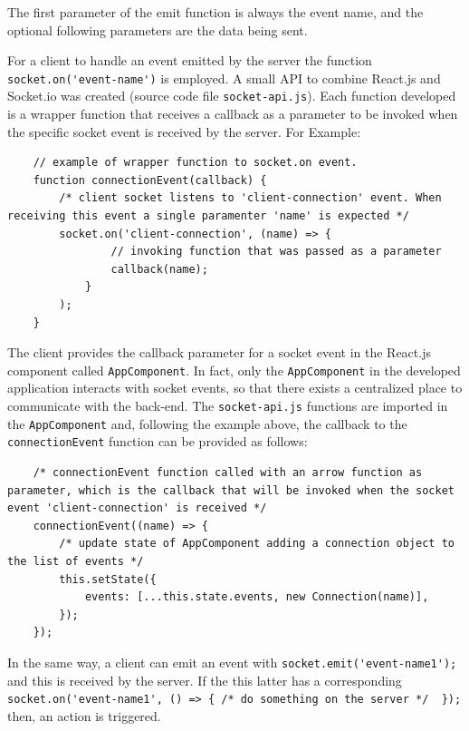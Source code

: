 The first parameter of the emit function is always the event name, and the optional following parameters are the data being sent. \newline

For a client to handle an event emitted by the server the function \lstinline{socket.on('event-name')} is employed. A small API to combine React.js and Socket.io was created (source code file \lstinline{socket-api.js}). Each function developed is a wrapper function that receives a callback as a parameter to be invoked when the specific socket event is received by the server. For Example: 
\begin{lstlisting}
    // example of wrapper function to socket.on event.
    function connectionEvent(callback) {
        /* client socket listens to 'client-connection' event. When receiving this event a single paramenter 'name' is expected */
        socket.on('client-connection', (name) => {
                // invoking function that was passed as a parameter
                callback(name);
            }
        );
    }
\end{lstlisting}

The client provides the callback parameter for a socket event in the React.js component called \lstinline{AppComponent}. In fact, only the \lstinline{AppComponent} in the developed application interacts with socket events, so that there exists a centralized place to communicate with the back-end. The \lstinline{socket-api.js} functions are imported in the \lstinline{AppComponent} and, following the example above, the callback to the \lstinline{connectionEvent} function can be provided as follows: 
\begin{lstlisting}
    /* connectionEvent function called with an arrow function as parameter, which is the callback that will be invoked when the socket event 'client-connection' is received */
    connectionEvent((name) => {
        /* update state of AppComponent adding a connection object to the list of events */
        this.setState({
            events: [...this.state.events, new Connection(name)],
        });
    });
\end{lstlisting}

In the same way, a client can emit an event with \lstinline{socket.emit('event-name1');} and this is received by the server. If the this latter has a corresponding \lstinline|socket.on('event-name1', () => { /* do something on the server */  });| then, an action is triggered. \newline


